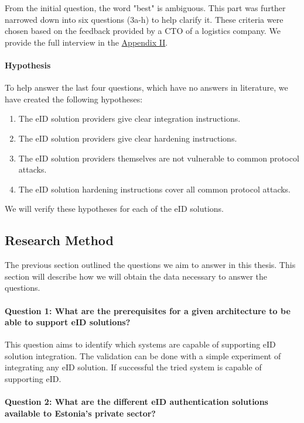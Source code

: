 From the initial question, the word "best" is ambiguous. This part was further narrowed down into six questions (3a-h) to help clarify it. These criteria were chosen based on the feedback provided by a CTO of a logistics company. We provide the full interview in the \hyperref[appendix:interview]{Appendix II}.

\paragraph{Hypothesis} To help answer the last four questions, which have no answers in literature, we have created the following hypotheses:

\begin{enumerate}
    \item The eID solution providers give clear integration instructions.
    \item The eID solution providers give clear hardening instructions.
    \item The eID solution providers themselves are not vulnerable to common protocol attacks.
    \item The eID solution hardening instructions cover all common protocol attacks.
\end{enumerate}

We will verify these hypotheses for each of the eID solutions.

\subsection{Research Method}

The previous section outlined the questions we aim to answer in this thesis. This section will describe how we will obtain the data necessary to answer the questions.

\paragraph{Question 1: What are the prerequisites for a given architecture to be able to support eID solutions?}\noindent

This question aims to identify which systems are capable of supporting eID solution integration. The validation can be done with a simple experiment of integrating any eID solution. If successful the tried system is capable of supporting eID.

\paragraph{Question 2: What are the different eID authentication solutions available to Estonia's private sector?}\noindent

